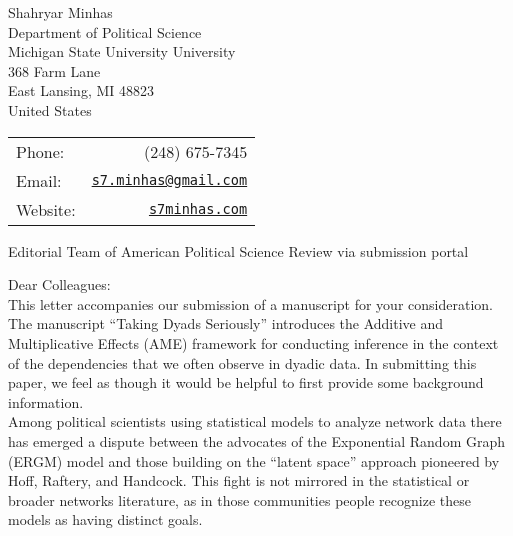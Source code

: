 \documentclass[letterpaper]{article}
\begin{document}
\thispagestyle{empty}

  
  
  \begin{minipage}{0.64\linewidth}
Shahryar Minhas \\
Department of Political Science \\
Michigan State University University \\
368 Farm Lane \\
East Lansing, MI 48823\\
United States
\end{minipage}
\begin{minipage}{0.45\linewidth}
  \begin{tabular}{lr}
    Phone: & (248) 675-7345 \\
    Email: & \href{mailto:s7.minhas@gmail.com}{\tt s7.minhas@gmail.com}  \\
    Website:& \href{http://s7minhas.com/}{\tt s7minhas.com}
  \end{tabular}
\end{minipage}
  
\vspace{.5in}

{Editorial Team of American Political Science Review via submission portal}

\vspace{0.25in}

Dear Colleagues:\\[1ex]

This letter accompanies our submission of a manuscript for your consideration. The manuscript ``Taking Dyads Seriously'' introduces the Additive and Multiplicative Effects (AME) framework for conducting inference in the context of the dependencies that we often observe in dyadic data. In submitting this paper, we feel as though it would be helpful to first provide some background information. \\[1ex]

Among political scientists using statistical models to analyze network data there has emerged a dispute between the advocates of the Exponential Random Graph (ERGM) model and those building on the ``latent space'' approach pioneered by Hoff, Raftery, and Handcock. This fight is not mirrored in the statistical or broader networks literature, as in those communities people recognize these models as having distinct goals. \\[1ex]
\end{document}
